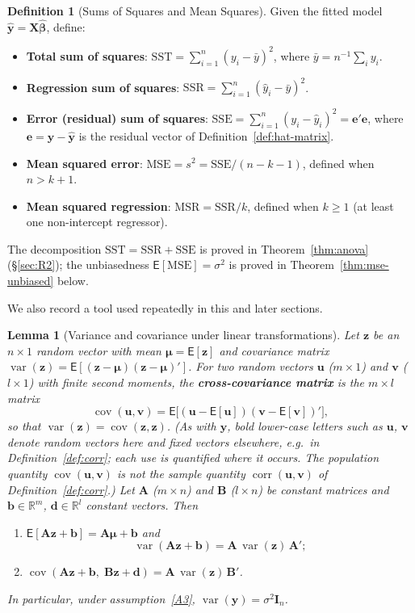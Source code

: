 \documentclass[14pt]{extarticle}
\theoremstyle{plain}
\newtheorem{lemma}[theorem]{Lemma}
\theoremstyle{definition}
\newtheorem{definition}[theorem]{Definition}
\theoremstyle{remark}
\newcommand\expc{\mathsf{E}}
\DeclareMathOperator\var{var}
\DeclareMathOperator\cov{cov}
\DeclareMathOperator\corr{corr}
\newcommand{\SST}{\mathrm{SST}}
\newcommand{\SSR}{\mathrm{SSR}}
\newcommand{\SSE}{\mathrm{SSE}}
\newcommand{\MSR}{\mathrm{MSR}}
\newcommand{\MSE}{\mathrm{MSE}}
\newcommand{\bX}{\mathbf{X}}
\newcommand{\by}{\mathbf{y}}
\def\bb{\boldsymbol{\beta}}
\newcommand{\bI}{\mathbf{I}}
\newcommand{\bz}{\mathbf{z}}
\newcommand{\bA}{\mathbf{A}}
\newcommand{\bv}{\mathbf{v}}
\newcommand{\Real}{\mathbb{R}}
\newcommand{\bu}{\mathbf{u}}
\begin{document}
\begin{definition}[Sums of Squares and Mean Squares]\label{def:sumsq}
Given the fitted model $\hat{\by} = \bX\hat{\bb}$, define:
\begin{itemize}
\item \textbf{Total sum of squares}: $\SST = \sum_{i=1}^n(y_i - \bar{y})^2$, where $\bar y = n^{-1}\sum_i y_i$.
\item \textbf{Regression sum of squares}: $\SSR = \sum_{i=1}^n(\hat{y}_i - \bar{y})^2$.
\item \textbf{Error (residual) sum of squares}: $\SSE = \sum_{i=1}^n(y_i - \hat{y}_i)^2 = \mathbf{e}'\mathbf{e}$, where $\mathbf{e} = \by - \hat{\by}$ is the residual vector of Definition~\ref{def:hat-matrix}.
\item \textbf{Mean squared error}: $\MSE = s^2 = \SSE/(n - k - 1)$, defined when $n > k + 1$.
\item \textbf{Mean squared regression}: $\MSR = \SSR/k$, defined when $k \geqslant 1$ (at least one non-intercept regressor).
\end{itemize}
The decomposition $\SST = \SSR + \SSE$ is proved in Theorem~\ref{thm:anova} (§\ref{sec:R2}); the unbiasedness $\expc[\MSE] = \sigma^2$ is proved in Theorem~\ref{thm:mse-unbiased} below.
\end{definition}

We also record a tool used repeatedly in this and later sections.

\begin{lemma}[Variance and covariance under linear transformations]\label{lem:var-linear}
Let $\bz$ be an $n \times 1$ random vector with mean $\boldsymbol\mu = \expc[\bz]$ and covariance matrix $\var(\bz) = \expc[(\bz - \boldsymbol\mu)(\bz - \boldsymbol\mu)']$. For two random vectors $\bu$ ($m \times 1$) and $\bv$ ($l \times 1$) with finite second moments, the \textbf{cross-covariance matrix} is the $m \times l$ matrix
\[
\cov(\bu, \bv) = \expc\bigl[(\bu - \expc[\bu])(\bv - \expc[\bv])'\bigr],
\]
so that $\var(\bz) = \cov(\bz, \bz)$. (As with $\by$, bold lower-case letters such as $\bu$, $\bv$ denote random vectors here and fixed vectors elsewhere, e.g.\ in Definition~\ref{def:corr}; each use is quantified where it occurs. The population quantity $\cov(\bu, \bv)$ is not the sample quantity $\corr(\bu, \bv)$ of Definition~\ref{def:corr}.) Let $\bA$ ($m \times n$) and $\mathbf{B}$ ($l \times n$) be constant matrices and $\mathbf{b} \in \Real^m$, $\mathbf{d} \in \Real^l$ constant vectors. Then
\begin{enumerate}[label=\textup{(\roman*)}]
\item\label{vl:i} $\expc[\bA\bz + \mathbf{b}] = \bA\boldsymbol\mu + \mathbf{b}$ and
\begin{equation}\label{eq:var-linear}
\var(\bA\bz + \mathbf{b}) = \bA\,\var(\bz)\,\bA';
\end{equation}
\item\label{vl:ii} $\cov(\bA\bz + \mathbf{b},\; \mathbf{B}\bz + \mathbf{d}) = \bA\,\var(\bz)\,\mathbf{B}'$.
\end{enumerate}
In particular, under assumption~\ref{A3}, $\var(\by) = \sigma^2\bI_n$.
\end{lemma}
\end{document}
